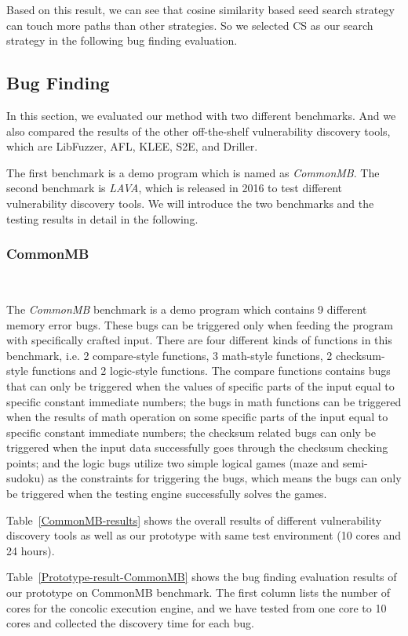 Based on this result, we can see that cosine similarity based seed search strategy can touch more paths than other strategies. So we selected CS as our search strategy in the following bug finding evaluation.

\subsection{Bug Finding}
In this section, we evaluated our method with two different benchmarks. And we also compared the results of the other off-the-shelf vulnerability discovery tools, which are LibFuzzer, AFL, KLEE, S2E, and Driller.

The first benchmark is a demo program which is named as \emph{CommonMB}. The second benchmark is \emph{LAVA}, which is released in 2016 to test different vulnerability discovery tools. We will introduce the two benchmarks and the testing results in detail in the following.


\subsubsection{CommonMB}~\par
\vskip0.5mm
\noindent The \emph{CommonMB} benchmark is a demo program which contains 9 different memory error bugs. These bugs can be triggered only when feeding the program with specifically crafted input. There are four different kinds of functions in this benchmark, i.e. 2 compare-style functions, 3 math-style functions, 2 checksum-style functions and 2 logic-style functions. The compare functions contains bugs that can only be triggered when the values of specific parts of the input equal to specific constant immediate numbers; the bugs in math functions can be triggered when the results of math operation on some specific parts of the input equal to specific constant immediate numbers; the checksum related bugs can only be triggered when the input data successfully goes through the checksum checking points; and the logic bugs utilize two simple logical games (maze and semi-sudoku) as the constraints for triggering the bugs, which means the bugs can only be triggered when the testing engine successfully solves the games.

Table~\ref{CommonMB-results} shows the overall results of different vulnerability discovery tools as well as our prototype with same test environment (10 cores and 24 hours). 

Table~\ref{Prototype-result-CommonMB} shows the bug finding evaluation results of our prototype on CommonMB benchmark. The first column lists the number of cores for the concolic execution engine, and we have tested from one core to 10 cores and collected the discovery time for each bug. 

